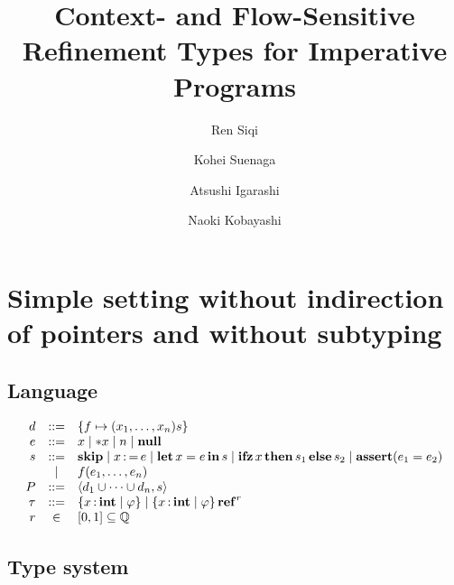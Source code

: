 \documentclass[runningheads]{llncs}
\begin{document}
%
\title{Context- and Flow-Sensitive Refinement Types for Imperative Programs}
%
%
\author{Ren Siqi \and Kohei Suenaga \and Atsushi Igarashi \and Naoki Kobayashi}
%
%
\institute{}
%
\maketitle              %
%
\begin{abstract}

\keywords{}
\end{abstract}
%
%
%

\section{Simple setting without indirection of pointers and without subtyping}

\subsection{Language}

\[
\begin{array}{rcl}  
    d &::=& \left\{{f \mapsto (x_1,\dots,x_n)s}\right\}\\
    e &::=& x \mid * x \mid n \mid \mathbf{null}\\
    s &::=& \mathbf{skip} \mid x \operatorname{:=} e \mid \operatorname{\mathbf{let}} x = e \operatorname{\mathbf{in}} s \mid \operatorname{\mathbf{ifz}} x \operatorname{\mathbf{then}} s_1 \operatorname{\mathbf{else}} s_2 \mid \mathbf{assert}(e_1 = e_2)\\
    &\mid& f(e_1,\dots,e_n)\\
    P &::=& \left\langle{d_1 \cup \dots \cup d_n, s}\right\rangle\\
    \tau &::=& \left\{{x \operatorname{:} \mathbf{int} \mid \varphi}\right\} \mid \left\{{x \operatorname{:} \mathbf{int} \mid \varphi}\right\} \operatorname{\mathbf{ref}}^{r}\\
    r &\in& [0,1] \subseteq \mathbb{Q}
\end{array}
\]

\subsection{Type system}



\end{document}
